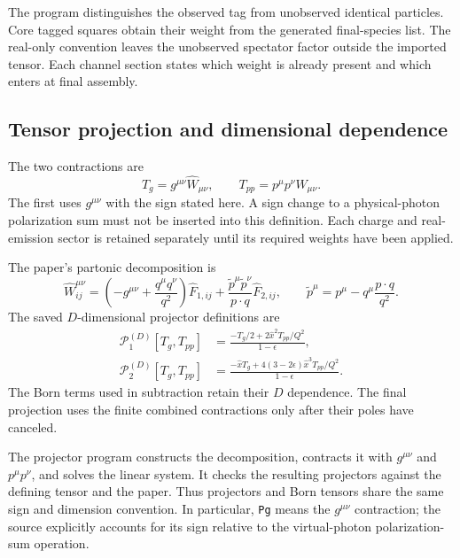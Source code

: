 \documentclass[11pt,a4paper]{article}
\newcommand{\eps}{\epsilon}
\newcommand{\Fhat}{\widehat F}
\newcommand{\What}{\widehat W}
\begin{document}
The program distinguishes the observed tag from unobserved identical
particles. Core tagged squares obtain their weight from the generated
final-species list. The real-only convention leaves the unobserved
spectator factor outside the imported tensor. Each channel section states
which weight is already present and which enters at final assembly.

\subsection{Tensor projection and dimensional dependence}

The two contractions are
\begin{equation}
 T_g=g^{\mu\nu}\What_{\mu\nu},\qquad
 T_{pp}=p^\mu p^\nu\What_{\mu\nu}.
 \label{eq:contractions}
\end{equation}
The first uses $g^{\mu\nu}$ with the sign stated here. A sign change to a
physical-photon polarization sum must not be inserted into this definition.
Each charge and real-emission sector is retained separately until its
required weights have been applied.

The paper's partonic decomposition is
\begin{equation}
 \What^{\mu\nu}_{ij}
 =\left(-g^{\mu\nu}+\frac{q^\mu q^\nu}{q^2}\right)\Fhat_{1,ij}
 +\frac{\widetilde p^\mu\widetilde p^\nu}{p\cdot q}\Fhat_{2,ij},
 \qquad
 \widetilde p^\mu=p^\mu-q^\mu\frac{p\cdot q}{q^2}.
\end{equation}
The saved $D$-dimensional projector definitions are
\begin{align}
 \mathcal P_1^{(D)}[T_g,T_{pp}]
 &=\frac{-T_g/2+2\hat x^2 T_{pp}/Q^2}{1-\eps},\\
 \mathcal P_2^{(D)}[T_g,T_{pp}]
 &=\frac{-\hat x T_g+4(3-2\eps)\hat x^3T_{pp}/Q^2}{1-\eps}.
 \label{eq:projectors}
\end{align}
The Born terms used in subtraction retain their $D$ dependence. The final
projection uses the finite combined contractions only after their poles
have canceled.

The projector program constructs the decomposition, contracts it with
$g^{\mu\nu}$ and $p^\mu p^\nu$, and solves the linear system. It
checks the resulting projectors against the defining tensor and the
paper. Thus projectors and Born tensors share the same sign and dimension
convention. In particular, \texttt{Pg} means the $g^{\mu\nu}$
contraction; the source explicitly accounts for its sign relative to the
virtual-photon polarization-sum operation.
\end{document}
